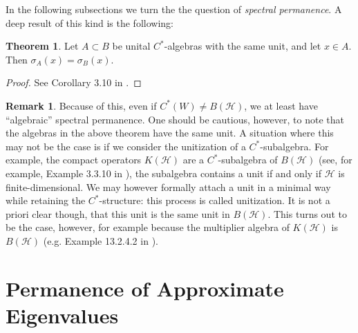 \documentclass{dcthesis}
\numberwithin{equation}{section}
\numberwithin{equation}{section}
\theoremstyle{definition}
\newtheorem{theorem}[equation]{Theorem}
\newtheorem{remark}[equation]{Remark}
\begin{document}
In the following subsections we turn the the question of \emph{spectral permanence}. A deep result of this kind is the following:

\begin{theorem}
	Let $A\subset B$ be unital $C^\ast$-algebras with the same unit, and let $x\in A$. Then $\sigma_A(x)=\sigma_B(x)$.
\end{theorem}
\begin{proof}
	See Corollary 3.10 in \cite{wilde_cstar}.
\end{proof}

\begin{remark}
	Because of this, even if $C^\ast(W)\neq B(\mathcal{H})$, we at least have ``algebraic'' spectral permanence. One should be cautious, however, to note that the algebras in the above theorem have the same unit. A situation where this may not be the case is if we consider the unitization of a $C^\ast$-subalgebra. For example, the compact operators $K(\mathcal{H})$ are a $C^\ast$-subalgebra of $B(\mathcal{H})$ (see, for example, Example 3.3.10 in \cite{wilde_cstar}), the subalgebra contains a unit if and only if $\mathcal{H}$ is finite-dimensional. We may however formally attach a unit in a minimal way while retaining the $C^\ast$-structure: this process is called unitization. It is not a priori clear though, that this unit is the same unit in $B(\mathcal{H})$. This turns out to be the case, however, for example because the multiplier algebra of $K(\mathcal{H})$ is $B(\mathcal{H})$ (e.g. Example 13.2.4.2 in \cite{farah_2019}).
\end{remark}


\section{Permanence of Approximate Eigenvalues} %
\end{document}
